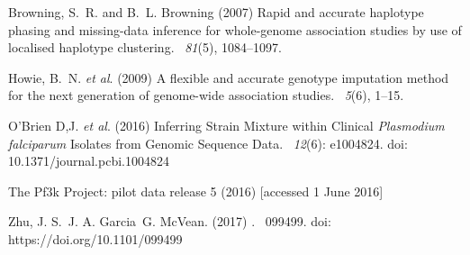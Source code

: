 \documentclass{article}
\begin{document}



\begin{thebibliography}{}

Browning, S.~R. and B.~L. Browning (2007)
\newblock Rapid and accurate haplotype phasing and missing-data inference for
  whole-genome association studies by use of localised haplotype clustering.
~{\em 81\/}(5), 1084--1097.

Howie, B.~N. {\em et al}. (2009)
\newblock A flexible and accurate genotype imputation method for the next generation of genome-wide association studies.
~{\em 5\/}(6), 1--15.

O'Brien D,J. {\em et al}. (2016)
\newblock Inferring Strain Mixture within Clinical {\em Plasmodium falciparum} Isolates from Genomic Sequence Data.
~{\em 12\/}(6): e1004824. doi: 10.1371/journal.pcbi.1004824

The Pf3k Project: pilot data release 5 (2016)
 [accessed 1 June 2016]

Zhu, J. S.\, J. A. Garcia\, G. McVean. (2017)
.
~{\em \/}099499. doi: https://doi.org/10.1101/099499

\end{thebibliography}
\end{document}

